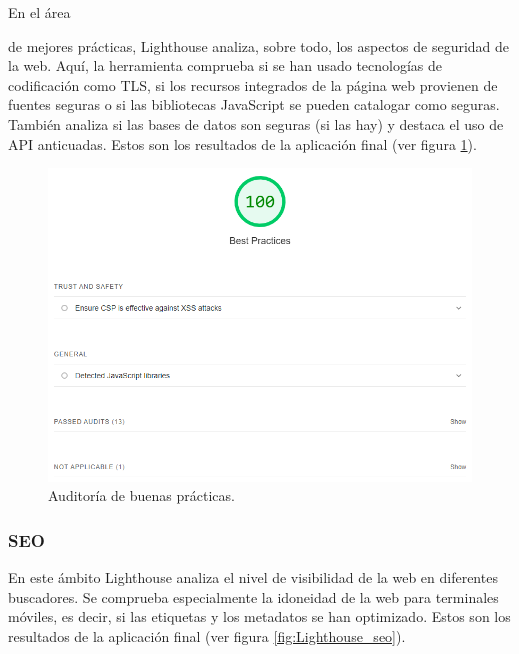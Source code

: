 \documentclass[12pt,twoside,titlepage]{report}
\begin{document}
En el área {de mejores prácticas, Lighthouse analiza, sobre todo, los aspectos de seguridad de la web. Aquí, la herramienta comprueba si se han usado tecnologías de codificación como TLS, si los recursos integrados de la página web provienen de fuentes seguras o si las bibliotecas JavaScript se pueden catalogar como seguras. También analiza si las bases de datos son seguras (si las hay) y destaca el uso de API anticuadas. Estos son los resultados de la aplicación final (ver figura \ref{fig:Lighthouse_bestpractices}).

\begin{figure}[H]
    \centering
    \includegraphics[scale=0.6]{Lighthouse/BestPractices}
    \caption{Auditoría de buenas prácticas.}
    \label{fig:Lighthouse_bestpractices}
\end{figure}

\subsubsection{SEO}

En este ámbito Lighthouse analiza el nivel de visibilidad de la web en diferentes buscadores. Se comprueba especialmente la idoneidad de la web para terminales móviles, es decir, si las etiquetas y los metadatos se han optimizado. Estos son los resultados de la aplicación final (ver figura \ref{fig:Lighthouse_seo}).

}
\end{document}
